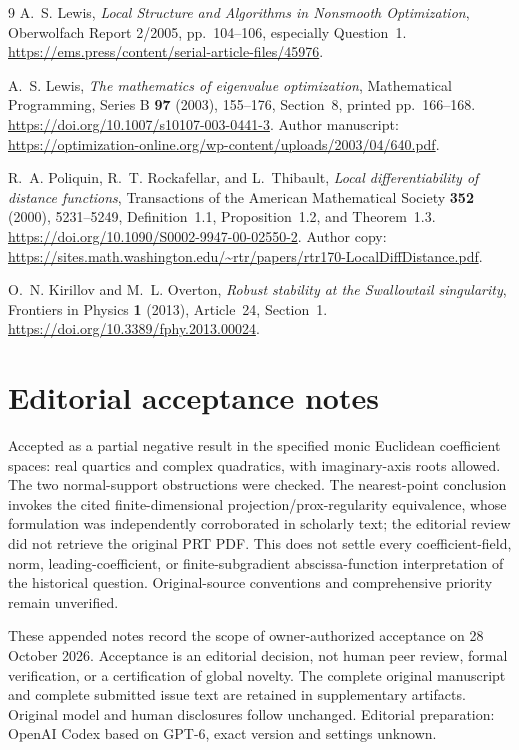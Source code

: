 \documentclass[11pt]{article}
\begin{document}
\begin{thebibliography}{9}
A.~S. Lewis,
\emph{Local Structure and Algorithms in Nonsmooth Optimization},
Oberwolfach Report 2/2005, pp.~104--106, especially Question~1.
\url{https://ems.press/content/serial-article-files/45976}.

A.~S. Lewis,
\emph{The mathematics of eigenvalue optimization},
Mathematical Programming, Series B \textbf{97} (2003), 155--176,
Section~8, printed pp.~166--168.
\url{https://doi.org/10.1007/s10107-003-0441-3}.
Author manuscript:
\url{https://optimization-online.org/wp-content/uploads/2003/04/640.pdf}.

R.~A. Poliquin, R.~T. Rockafellar, and L.~Thibault,
\emph{Local differentiability of distance functions},
Transactions of the American Mathematical Society
\textbf{352} (2000), 5231--5249,
Definition~1.1, Proposition~1.2, and Theorem~1.3.
\url{https://doi.org/10.1090/S0002-9947-00-02550-2}.
Author copy:
\url{https://sites.math.washington.edu/~rtr/papers/rtr170-LocalDiffDistance.pdf}.

O.~N. Kirillov and M.~L. Overton,
\emph{Robust stability at the Swallowtail singularity},
Frontiers in Physics \textbf{1} (2013), Article~24,
Section~1.
\url{https://doi.org/10.3389/fphy.2013.00024}.
\end{thebibliography}
\section{Editorial acceptance notes}

Accepted as a partial negative result in the specified monic Euclidean coefficient spaces: real quartics and complex quadratics, with imaginary-axis roots allowed. The two normal-support obstructions were checked. The nearest-point conclusion invokes the cited finite-dimensional projection/prox-regularity equivalence, whose formulation was independently corroborated in scholarly text; the editorial review did not retrieve the original PRT PDF. This does not settle every coefficient-field, norm, leading-coefficient, or finite-subgradient abscissa-function interpretation of the historical question. Original-source conventions and comprehensive priority remain unverified.

These appended notes record the scope of owner-authorized acceptance on 28 October 2026. Acceptance is an editorial decision, not human peer review, formal verification, or a certification of global novelty. The complete original manuscript and complete submitted issue text are retained in supplementary artifacts. Original model and human disclosures follow unchanged. Editorial preparation: OpenAI Codex based on GPT-6, exact version and settings unknown.
\end{document}
